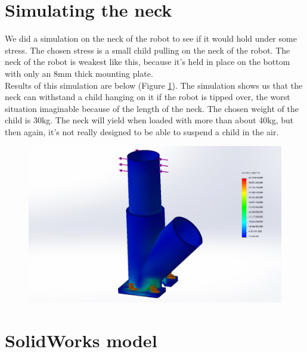 \documentclass[11pt,twoside,a4paper]{report}
\begin{document}
\section{Simulating the neck}
We did a simulation on the neck of the robot to see if it would hold under some stress. The chosen stress is a small child pulling on the neck of the robot. The neck of the robot is weakest like this, because it\rq{}s held in place on the bottom with only an 8mm thick mounting plate.\\
Results of this simulation are below (Figure \ref{fig:simluation}). The simulation shows us that the neck can withstand a child hanging on it if the robot is tipped over, the worst situation imaginable because of the length of the neck. The chosen weight of the child is 30kg. The neck will yield when loaded with more than about 40kg, but then again, it\rq{}s not really designed to be able to suspend a child in the air.

\begin{figure}[!htb]
\begin{center}
\includegraphics[width=14cm]{Images/result_simulation.jpg}
\caption{ }
\label{fig:simluation}
\end{center}
\end{figure}
\label{sect:NeckSim}
\section{SolidWorks model}
\end{document}

